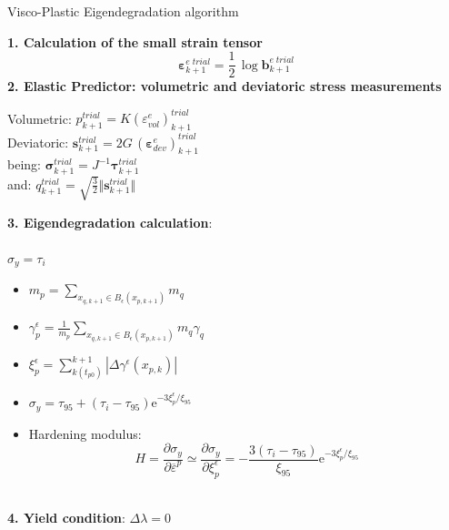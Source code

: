 \documentclass[applsci,journal,article,submit,moreauthors,pdftex]{Definitions/mdpi}
\begin{document}
\begin{algorithm}[ht]
\caption{Visco-Plastic Eigendegradation algorithm}\label{alg1}
\begin{algorithmic}
\State \textbf{1. Calculation of the small strain tensor}
$$
\boldsymbol{\varepsilon}^{e\; trial}_{k+1}=\frac{1}{2}\,\log\mathbf{b}^{e\; trial}_{k+1}
$$
\State
\textbf{2. Elastic Predictor: volumetric and deviatoric stress measurements}
\begin{center}
Volumetric:  $p^{trial}_{k+1}=K \left(\varepsilon^{e}_{vol}\right)^{trial}_{k+1}$\\
Deviatoric:  $
\mathbf{s}^{trial}_{k+1}=2G\,\left(\boldsymbol{\varepsilon}^{e}_{dev}\right)^{trial}_{k+1}
$\\
\vspace{0.3cm}
being: $
\mathbf{\sigma}^{trial}_{k+1}=J^{-1}\mathbf{\tau}^{trial}_{k+1}
$\\
\vspace{0.3cm}
and:
$q^{trial}_{k+1}=\sqrt{\frac{3}{2}} \Vert \mathbf{s}^{trial}_{k+1} \Vert$
\vspace{0.15cm}
\end{center}
\textbf{3. Eigendegradation calculation}:\\
\\
$\sigma_y=\tau_i$
\ELSE
\begin{itemize}
\item
$
m_{p}=\sum_{x_{q,k+1}\in B_\epsilon (x_{p,k+1})}m_q
$
\vspace{0.15cm}
\item
$
\gamma^{\epsilon}_{p}=\frac{1}{m_{p}}\sum_{x_{q,k+1}\in B_\epsilon (x_{p,k+1})}m_q \gamma_{q}
$
\vspace{0.15cm}
\item
$
\xi^{\epsilon}_{p}=\sum^{k+1}_{k(t_{p0})} \left|\Delta\gamma^{\epsilon}(x_{p,k})\right| 
$
\vspace{0.15cm}
\item
$
\sigma_y=\tau_{95}+\left(\tau_{i}-\tau_{95}\right) \mathrm{e}^{-3 \xi^{\epsilon}_{p} / \xi_{95}}
$
\vspace{0.15cm}
\item Hardening modulus:
$$
H=\frac{\partial \sigma_y}{\partial\overline{\varepsilon}^p} \simeq \frac{\partial \sigma_y}{\partial \xi^{\epsilon}_{p}} = -\frac{3\left(\tau_{i}-\tau_{95}\right)}{\xi_{95}} \mathrm{e}^{-3 \xi^{\epsilon}_{p} / \xi_{95}}
$$
\end{itemize}
\ENDIF
\\
\vspace{0.3cm}
\textbf{4. Yield condition}: $\Delta\lambda=0$\\

\end{algorithmic}
\end{algorithm}
\end{document}
